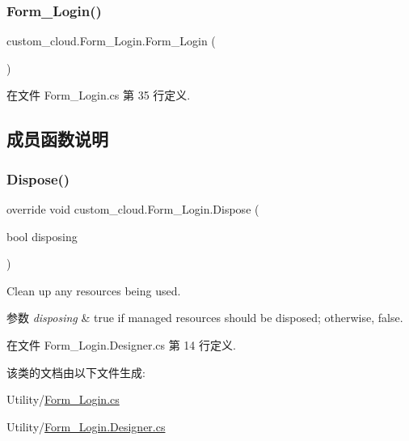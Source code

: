 \subsubsection{\texorpdfstring{Form\+\_\+\+Login()}{Form\_Login()}}
{\footnotesize\ttfamily custom\+\_\+cloud.\+Form\+\_\+\+Login.\+Form\+\_\+\+Login (\begin{DoxyParamCaption}{ }\end{DoxyParamCaption})}



在文件 Form\+\_\+\+Login.\+cs 第 35 行定义.



\subsection{成员函数说明}
\mbox{\label{classcustom__cloud_1_1_form___login_a2a799c7200f8378b56a85bf17994dc31}} 
\subsubsection{\texorpdfstring{Dispose()}{Dispose()}}
{\footnotesize\ttfamily override void custom\+\_\+cloud.\+Form\+\_\+\+Login.\+Dispose (\begin{DoxyParamCaption}\item[{bool}]{disposing }\end{DoxyParamCaption})\hspace{0.3cm}{\ttfamily [protected]}}



Clean up any resources being used. 


\begin{DoxyParams}{参数}
{\em disposing} & true if managed resources should be disposed; otherwise, false.\\
\hline
\end{DoxyParams}


在文件 Form\+\_\+\+Login.\+Designer.\+cs 第 14 行定义.



该类的文档由以下文件生成\+:\begin{DoxyCompactItemize}
\item 
Utility/\hyperlink{_form___login_8cs}{Form\+\_\+\+Login.\+cs}\item 
Utility/\hyperlink{_form___login_8_designer_8cs}{Form\+\_\+\+Login.\+Designer.\+cs}\end{DoxyCompactItemize}
